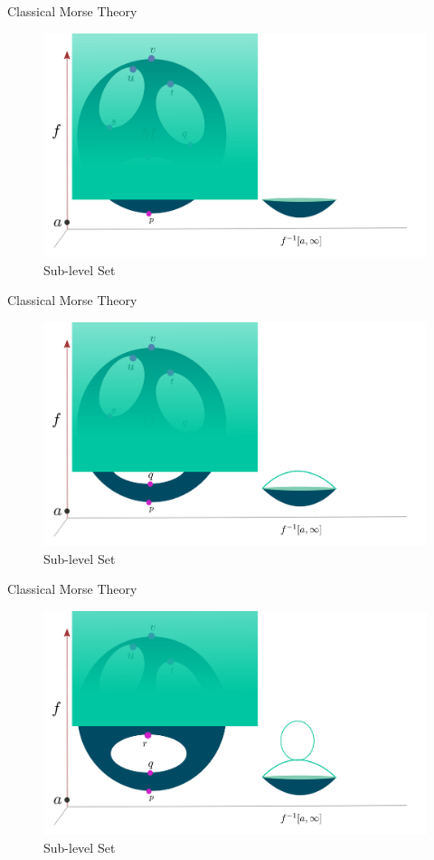\documentclass[10pt,sans-serif]{beamer}
\begin{document}
\begin{frame}{Classical Morse Theory}  
  \begin{figure}
    \centering
    \includegraphics[scale=0.2]{2}
    \caption{Sub-level Set}
  \end{figure}
\end{frame}

\begin{frame}{Classical Morse Theory}
  \begin{figure}
    \centering
    \includegraphics[scale=0.2]{3}
    \caption{Sub-level Set}
  \end{figure}
\end{frame}

\begin{frame}{Classical Morse Theory}
  \begin{figure}
    \centering
    \includegraphics[scale=0.2]{4}
    \caption{Sub-level Set}
  \end{figure}
\end{frame}
\end{document}
